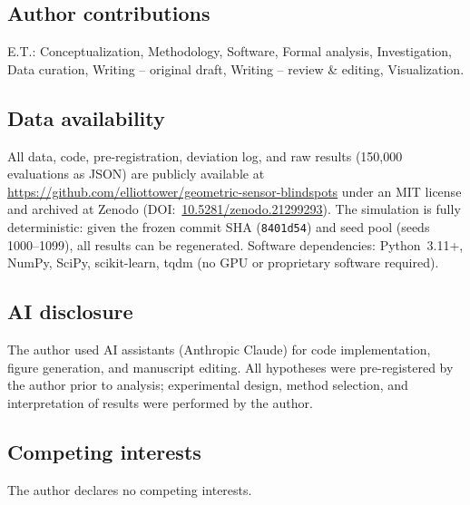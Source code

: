 \documentclass[11pt]{article}
\providecommand{\roles}[1]{\subsection*{Author contributions}#1}
\providecommand{\data}[1]{\subsection*{Data availability}#1}
\begin{document}
\roles{E.T.: Conceptualization, Methodology, Software, Formal analysis,
Investigation, Data curation, Writing -- original draft,
Writing -- review \& editing, Visualization.}

\data{All data, code, pre-registration, deviation log, and raw results
(150,000 evaluations as JSON) are publicly available at
\url{https://github.com/elliottower/geometric-sensor-blindspots}
under an MIT license and archived at Zenodo
(DOI:~\href{https://doi.org/10.5281/zenodo.21299293}{10.5281/zenodo.21299293}).
The simulation is fully deterministic: given the frozen commit SHA
(\texttt{8401d54}) and seed pool (seeds 1000--1099), all results can be
regenerated.  Software dependencies: Python~3.11+, NumPy, SciPy,
scikit-learn, tqdm (no GPU or proprietary software required).}

\subsection*{AI disclosure}

The author used AI assistants (Anthropic Claude) for code implementation,
figure generation, and manuscript editing.  All hypotheses were
pre-registered by the author prior to analysis; experimental design,
method selection, and interpretation of results were performed by the
author.

\subsection*{Competing interests}

The author declares no competing interests.

% 


\end{document}
